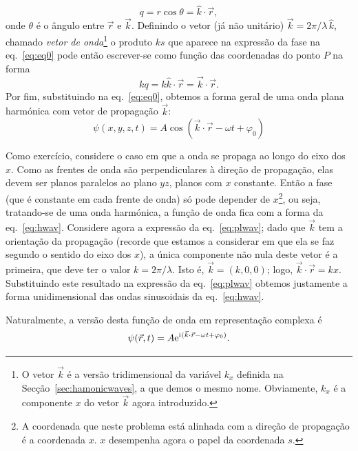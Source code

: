 \begin{equation*}
  q = r\cos\theta = \hat k\cdot\vec r,
\end{equation*}
onde $\theta$ é o ângulo entre $\vec r$ e $\vec k$.  Definindo o vetor (já não
unitário) $\vec k=2\pi/\lambda\,\hat k$, chamado \emph{vetor de
onda}\footnote{O vetor $\vec k$ é a versão tridimensional da
variável $k_x$ definida na Secção~\ref{sec:hamonicwaves}, a que demos o mesmo
nome. Obviamente, $k_x$ é a componente $x$ do vetor $\vec k$ agora introduzido.}
o produto $ks$ que aparece na expressão da fase na eq.~\eqref{eq:eq0} pode então
escrever-se como função das coordenadas do ponto $P$ na forma
\begin{equation*}
  kq=k\hat k\cdot \vec r=\vec k\cdot\vec r.
\end{equation*}
Por fim, substituindo na eq.~\eqref{eq:eq0}, obtemos a forma geral de uma onda
plana harmónica com vetor de propagação $\vec k$:
\begin{equation} \label{eq:plwav}
\psi(x,y,z,t)=A\cos(\vec k\cdot\vec r-\omega t+\varphi_0)
\end{equation}

Como exercício, considere o caso em que a onda se propaga ao longo do eixo dos
$x$. Como as frentes de onda são perpendiculares à direção de propagação, elas
devem ser planos paralelos ao plano $yz$, planos com $x$ constante. Então a fase
(que é constante em cada frente de onda) só pode depender de $x$\footnote{A
  coordenada que neste problema está alinhada com a direção de propagação é a
coordenada $x$. $x$ desempenha agora o papel da coordenada $s$.}, ou seja,
tratando-se de uma onda harmónica, a função de onda fica com a forma da
eq.~\eqref{eq:hwav}. Considere agora a expressão da eq.~\eqref{eq:plwav}; dado
que $\vec k$ tem a orientação da propagação (recorde que estamos a considerar em
que ela se faz segundo o sentido do eixo dos $x$), a única componente não nula
deste vetor é a primeira, que deve ter o valor $k=2\pi/\lambda$. Isto é, $\vec
k=(k,0,0)$; logo, $\vec k\cdot\vec r=kx$.  Substituindo este resultado na
expressão da eq.~\eqref{eq:plwav} obtemos justamente a forma unidimensional das
ondas sinusoidais da eq.~\eqref{eq:hwav}.

Naturalmente, a versão desta função de onda em representação complexa é
\begin{equation}\label{eq:phwfexp}
  \psi(\vec r,t)=A\e^{\iu(\vec k\cdot \vec r-\omega t+\varphi_0)}.
\end{equation}

